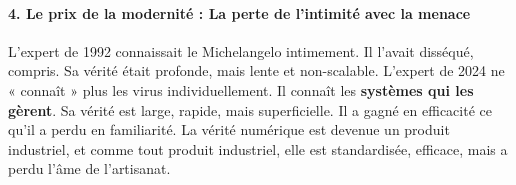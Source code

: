 \documentclass[12pt]{article}
\begin{document}
\paragraph{4. Le prix de la modernité : La perte de l'intimité avec la menace}

L'expert de 1992 connaissait le Michelangelo intimement. Il l'avait disséqué, compris. Sa vérité était profonde, mais lente et non-scalable. L'expert de 2024 ne « connaît » plus les virus individuellement. Il connaît les \textbf{systèmes qui les gèrent}. Sa vérité est large, rapide, mais superficielle. Il a gagné en efficacité ce qu'il a perdu en familiarité. La vérité numérique est devenue un produit industriel, et comme tout produit industriel, elle est standardisée, efficace, mais a perdu l'âme de l'artisanat.

\vspace{1cm}

\begin{center}
\end{center} 
\end{document}
